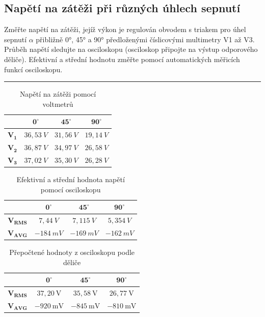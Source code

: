 \documentclass[a4paper,12pt]{article}
\begin{document}
\subsection{Napětí na zátěži při různých úhlech sepnutí}
Změřte napětí na zátěži, jejíž výkon je regulován obvodem s triakem pro úhel sepnutí $\alpha$ přibližně 0°, 45° a 90° předloženými číslicovými multimetry V1 až V3.
Průběh napětí sledujte na osciloskopu (osciloskop připojte na výstup odporového děliče). Efektivní a střední hodnotu změřte pomocí automatických měřicích funkcí osciloskopu.
\par\noindent\rule{\textwidth}{0.4pt}

\begin{table}[H]
\centering
\begin{tabular}{|c|c|c|c|}
\hline
 & $\mathbf{0^\circ}$ & $\mathbf{45^\circ}$ & $\mathbf{90^\circ}$ \\
\hline
$\mathbf{V_1}$ & $36,53\ V$ & $31,56\ V$ & $19,14\ V$ \\
\hline
$\mathbf{V_2}$ & $36,87\ V$ & $34,97\ V$ & $26,58\ V$ \\
\hline
$\mathbf{V_3}$ & $37,02\ V$ & $35,30\ V$ & $26,28\ V$ \\
\hline
\end{tabular}
\caption{Napětí na zátěži pomocí voltmetrů}
\end{table}

\begin{table}[H]
\centering
\begin{tabular}{|c|c|c|c|}
\hline
 & $\mathbf{0^\circ}$ & $\mathbf{45^\circ}$ & $\mathbf{90^\circ}$ \\
\hline
$\mathbf{V_{RMS}}$ & $7,44\ V$ & $7,115\ V$ & $5,354\ V$ \\
\hline
$\mathbf{V_{AVG}}$ & $-184\ mV$ & $-169\ mV$ & $-162\ mV$ \\
\hline
\end{tabular}
\caption{Efektivní a střední hodnota napětí pomocí osciloskopu}
\end{table}

\begin{table}[H]
\centering
\begin{tabular}{|c|c|c|c|}
\hline
 & $\mathbf{0^\circ}$ & $\mathbf{45^\circ}$ & $\mathbf{90^\circ}$ \\
\hline
$\mathbf{V_{RMS}}$ & $37{,}20\ \mathrm{V}$ & $35{,}58\ \mathrm{V}$ & $26{,}77\ \mathrm{V}$ \\
\hline
$\mathbf{V_{AVG}}$ & $-920\ \mathrm{mV}$ & $-845\ \mathrm{mV}$ & $-810\ \mathrm{mV}$ \\
\hline
\end{tabular}
\caption{Přepočtené hodnoty z osciloskopu podle děliče}
\end{table}
\end{document}
